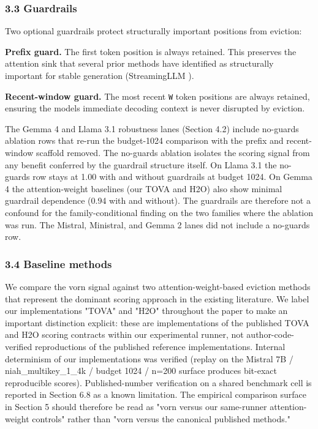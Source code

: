 \documentclass[
]{article}
\begin{document}
\subsubsection{3.3 Guardrails}\label{33-guardrails}

Two optional guardrails protect structurally important positions from
eviction:

\textbf{Prefix guard.} The first token position is always retained. This
preserves the attention sink that several prior methods have identified
as structurally important for stable generation (StreamingLLM \citep{xiao2023streamingllm}).

\textbf{Recent-window guard.} The most recent \texttt{W} token positions
are always retained, ensuring the model\textquotesingle s immediate
decoding context is never disrupted by eviction.

The Gemma 4 and Llama 3.1 robustness lanes (Section 4.2) include
no-guards ablation rows that re-run the budget-1024 comparison with the
prefix and recent-window scaffold removed. The no-guards ablation
isolates the scoring signal from any benefit conferred by the guardrail
structure itself. On Llama 3.1 the no-guards row stays at 1.00 with and
without guardrails at budget 1024. On Gemma 4 the attention-weight
baselines (our TOVA and H2O) also show minimal guardrail
dependence (0.94 with and without). The guardrails are therefore not a
confound for the family-conditional finding on the two families where
the ablation was run. The Mistral, Ministral, and Gemma 2 lanes did not
include a no-guards row.

\subsubsection{3.4 Baseline methods}\label{34-baseline-methods}

We compare the vorn signal against two attention-weight-based eviction
methods that represent the dominant scoring approach in the existing
literature. We label our implementations "TOVA" and "H2O"
throughout the paper to make an important distinction explicit: these
are implementations of the published TOVA and H2O scoring contracts
within our experimental runner, not author-code-verified reproductions
of the published reference implementations. Internal determinism of our
implementations was verified (replay on the Mistral 7B /
niah\_multikey\_1\_4k / budget 1024 / n=200 surface produces bit-exact
reproducible scores). Published-number verification on a shared
benchmark cell is reported in Section 6.8 as a known limitation. The
empirical comparison surface in Section 5 should therefore be read as
"vorn versus our same-runner attention-weight controls" rather than
"vorn versus the canonical published methods."
\end{document}
